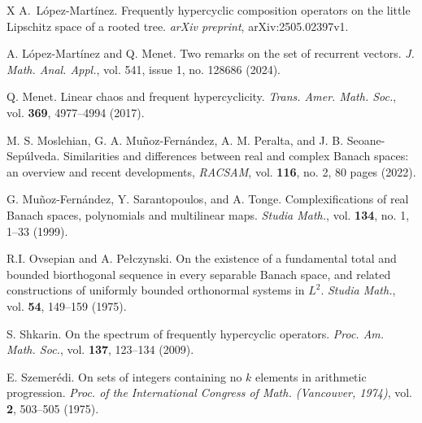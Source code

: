 \documentclass[openright,11pt]{article}
\theoremstyle{plain}
\theoremstyle{definition}
\begin{document}
{\begin{thebibliography}{X}
	 A.~L\'opez-Mart\'inez. Frequently hypercyclic composition operators on the little Lipschitz space of a rooted tree. \textit{arXiv preprint}, arXiv:2505.02397v1.%
	
	 A. L\'opez-Mart\'inez and Q. Menet. Two remarks on the set of recurrent vectors. \textit{J. Math. Anal. Appl.}, vol. 541, issue 1, no. 128686 (2024).%
	
	 Q. Menet. Linear chaos and frequent hypercyclicity. \textit{Trans. Amer. Math. Soc.}, vol. \textbf{369}, 4977--4994 (2017).%
	
	 M. S. Moslehian, G. A. Mu\~noz-Fern\'andez, A. M. Peralta, and J. B. Seoane-Sep\'ulveda. Similarities and differences between real and complex Banach spaces: an overview and recent developments, \textit{RACSAM}, vol. \textbf{116}, no. 2, 80 pages (2022).%
	
	 G. Mu\~{n}oz-Fern\'andez, Y. Sarantopoulos, and A. Tonge. Complexifications of real Banach spaces, polynomials and multilinear maps. \textit{Studia Math.}, vol. \textbf{134}, no. 1, 1--33 (1999).%
	
	 R.I. Ovsepian and A. Pe\l czynski. On the existence of a fundamental total and bounded biorthogonal sequence in every separable Banach space, and related constructions of uniformly bounded orthonormal systems in $L^2$. \textit{Studia Math.}, vol. \textbf{54}, 149--159 (1975).%
	
	 S. Shkarin. On the spectrum of frequently hypercyclic operators. \textit{Proc. Am. Math. Soc.}, vol. \textbf{137}, 123--134 (2009).%
	
	 E. Szemer\'edi. On sets of integers containing no $k$ elements in arithmetic progression. \textit{Proc. of the International
	Congress of Math. (Vancouver, 1974)}, vol. \textbf{2}, 503--505 (1975).%

\end{thebibliography}
}

\newpage
\end{document}
